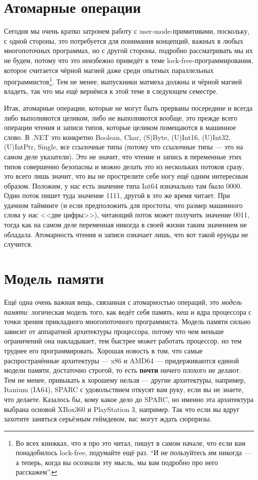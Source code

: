 \documentclass{../../text-style}
\begin{document}
\section{Атомарные операции}

Сегодня мы очень кратко затронем работу с user-mode-примитивами, поскольку, с одной стороны, это потребуется для понимания концепций, важных в любых многопоточных программах, но с другой стороны, подробно рассматривать мы их не будем, потому что это неизбежно приведёт к теме lock-free-программирования, которое считается чёрной магией даже среди опытных параллельных программистов\footnote{Во всех книжках, что я про это читал, пишут в самом начале, что если вам понадобилось lock-free, подумайте ещё раз. ``И не пользуйтесь им никогда --- а теперь, когда вы осознали эту мысль, мы вам подробно про него расскажем''.}. Тем не менее, выпускники матмеха должны и чёрной магией владеть, так что мы ещё вернёмся к этой теме в следующем семестре.

Итак, атомарные операции, которые не могут быть прерваны посередине и всегда либо выполняются целиком, либо не выполняются вообще, это прежде всего операции чтения и записи типов, которые целиком помещаются в машинное слово. В .NET это конкретно Boolean, Char, (S)Byte, (U)Int16, (U)Int32, (U)IntPtr, Single, все ссылочные типы (потому что ссылочные типы --- это на самом деле указатели). Это не значит, что чтение и запись в переменные этих типов совершенно безопасны и можно делать это из нескольких потоков сразу, это всего лишь значит, что вы не прострелите себе ногу ещё одним интересным образом. Положим, у нас есть значение типа Int64 изначально там было 0000. Один поток пишет туда значение 1111, другой в это же время читает. При удачном тайминге (и если предположить для простоты, что размер машинного слова у нас <<две цифры>>), читающий поток может получить значение 0011, тогда как на самом деле переменная никогда в своей жизни таким значением не обладала. Атомарность чтения и записи означает лишь, что вот такой ерунды не случится.

\section{Модель памяти}

Ещё одна очень важная вещь, связанная с атомарностью операций, это \textit{модель памяти}: логическая модель того, как ведёт себя память, кеш и ядра процессора с точки зрения прикладного многопоточного программиста. Модель памяти сильно зависит от аппаратной архитектуры процессора, потому что чем меньше ограничений она накладывает, тем быстрее может работать процессор, но тем труднее его программировать. Хорошая новость в том, что самые распространённые архитектуры --- x86 и AMD64 --- придерживаются единой модели памяти, достаточно строгой, то есть \textbf{почти} ничего плохого не делают. Тем не менее, привыкать к хорошему нельзя --- другие архитектуры, например, Itanium (IA64), SPARC с удовольствием откусят вам руку, если вы не знаете, что делаете. Казалось бы, кому какое дело до SPARC, но именно эта архитектура выбрана основой XBox360 и PlayStation 3, например. Так что если вы вдруг захотите заняться серьёзным геймдевом, вас могут ждать сюрпризы.
\end{document}
